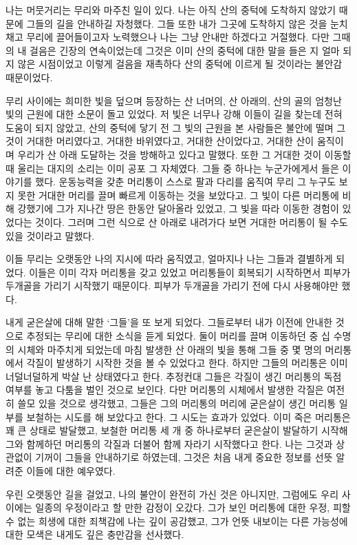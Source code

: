 \documentclass[12pt, b6paper, openany]{memoir}
\newenvironment{article}{}{}
\begin{document}
\begin{article}
나는 머뭇거리는 무리와 마주친 일이 있다. 나는 아직 산의 중턱에 도착하지 않았기 때문에 그들의 길을 안내하길 자청했다. 그들 또한 내가 그곳에 도착하지 않은 것을 눈치채고 무리에 끌어들이고자 노력했으나 나는 그냥 안내만 하겠다고 거절했다. 다만 그때의 내 걸음은 긴장의 연속이었는데 그것은 이미 산의 중턱에 대한 말을 들은 지 얼마 되지 않은 시점이었고 이렇게 걸음을 재촉하다 산의 중턱에 이르게 될 것이라는 불안감 때문이었다.

무리 사이에는 희미한 빛을 덮으며 등장하는 산 너머의, 산 아래의, 산의 골의 엄청난 빛의 근원에 대한 소문이 돌고 있었다. 저 빛은 너무나 강해 이들이 길을 찾는데 전혀 도움이 되지 않았고, 산의 중턱에 닿기 전 그 빛의 근원을 본 사람들은 불안에 떨며 그것이 거대한 머리였다고, 거대한 바위였다고, 거대한 산이었다고, 거대한 산이 움직이며 우리가 산 아래 도달하는 것을 방해하고 있다고 말했다. 또한 그 거대한 것이 이동할 때 울리는 대지의 소리는 이미 공포 그 자체였다. 그들 중 하나는 누군가에게서 들은 이야기를 했다. 운동능력을 갖춘 머리통이 스스로 팔과 다리를 움직여 무리 그 누구도 보지 못한 거대한 머리를 끌며 빠르게 이동하는 것을 보았다고. 그 빛이 다른 머리통에 비해 강했기에 그가 지나간 땅은 한동안 달아올라 있었고, 그 빛을 따라 이동한 경험이 있었다는 것이다. 그러며 그런 식으로 산 아래로 내려가다 보면 거대한 머리통이 될 수도 있을 것이라고 말했다.

이들 무리는 오랫동안 나의 지시에 따라 움직였고, 얼마지나 나는 그들과 결별하게 되었다. 이들은 이미 각자 머리통을 갖고 있었고 머리통들이 회복되기 시작하면서 피부가 두개골을 가리기 시작했기 때문이다. 피부가 두개골을 가리기 전에 다시 사용해야만 했다.

내게 굳은살에 대해 말한 `그들'을 또 보게 되었다. 그들로부터 내가 이전에 안내한 것으로 추정되는 무리에 대한 소식을 듣게 되었다. 둘이 머리를 끌며 이동하던 중 십 수명의 시체와 마주치게 되었는데 마침 발생한 산 아래의 빛을 통해 그들 중 몇 명의 머리통에서 각질이 발생하기 시작한 것을 볼 수 있었다고 한다. 하지만 그들의 머리통은 이미 너덜너덜하게 박살 난 상태였다고 한다. 추정컨대 그들은 각질이 생긴 머리통의 독점 여부를 놓고 다툼을 벌인 것으로 보인다. 다만 머리통의 시체에서 발생한 각질은 여전히 쓸모 있을 것으로 생각했고, 그들은 그의 머리통의 머리에 굳은살이 생긴 머리통 일부를 보철하는 시도를 해 보았다고 한다. 그 시도는 효과가 있었다. 이미 죽은 머리통은 꽤 큰 상태로 발달했고, 보철한 머리통 세 개 중 하나로부터 굳은살이 발달하기 시작해 그와 함께하던 머리통의 각질과 더불어 함께 자라기 시작했다고 한다. 나는 그것과 상관없이 기꺼이 그들을 안내하기로 하였는데, 그것은 처음 내게 중요한 정보를 선뜻 알려준 이들에 대한 예우였다.

우린 오랫동안 길을 걸었고, 나의 불안이 완전히 가신 것은 아니지만, 그럼에도 우리 사이에는 일종의 우정이라고 할 만한 감정이 오갔다. 그가 보인 머리통에 대한 우정, 피할 수 없는 희생에 대한 죄책감에 나는 깊이 공감했고, 그가 언뜻 내보이는 다른 가능성에 대한 모색은 내게도 깊은 충만감을 선사했다.


\end{article}
\end{document}
